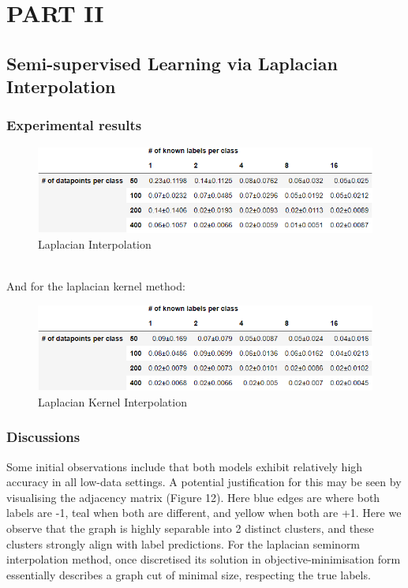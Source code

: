 \documentclass[12pt]{article}
\begin{document}
\newpage
\section{PART II}
\subsection{Semi-supervised Learning via Laplacian Interpolation}

\subsubsection{Experimental results}

    \begin{figure}[h]
    \centering
    \includegraphics[scale=0.5]{outputs/part2/laplacian_interpolation_report.png}
    \caption{Laplacian Interpolation}
    \label{fig:12}
    \end{figure}

\\

And for the laplacian kernel method:
    \begin{figure}[h]
    \centering
    \includegraphics[scale=0.5]{outputs/part2/laplacian_kernel_interpolation_report.png}
    \caption{Laplacian Kernel Interpolation}
    \label{fig:13}
    \end{figure}

\subsubsection{Discussions}

Some initial observations include that both models exhibit relatively high accuracy in all low-data settings. A potential justification for this may be seen by visualising 
the adjacency matrix (Figure 12). Here blue edges are where both labels are -1, teal when both are different, and yellow when both are +1. Here we observe that the
 graph is highly separable into 2 distinct clusters, and these clusters strongly align with label predictions. For the laplacian seminorm interpolation method, once discretised its solution in
objective-minimisation form essentially describes a graph cut of minimal size, respecting the true labels. 
\end{document}
